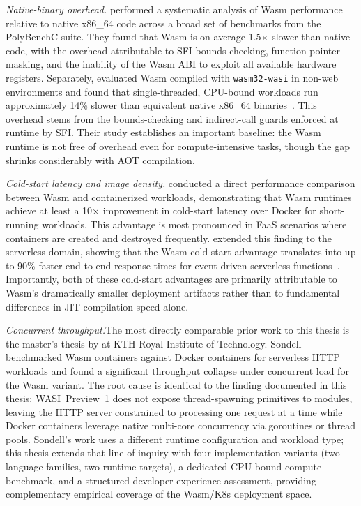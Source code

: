 \textit{Native-binary overhead.}\quad \textcite{jangda2019notsofast} performed a systematic analysis of \acs{Wasm} performance relative to native x86\_64 code across a broad set of benchmarks from the PolyBenchC suite. They found that \acs{Wasm} is on average 1.5$\times$ slower than native code, with the overhead attributable to \acs{SFI} bounds-checking, function pointer masking, and the inability of the \acs{Wasm} \acs{ABI} to exploit all available hardware registers. Separately, \textcite{spies2021evaluation} evaluated \acs{Wasm} compiled with \texttt{wasm32-wasi} in non-web environments and found that single-threaded, \acs{CPU}-bound workloads run approximately 14\% slower than equivalent native x86\_64 binaries~\cite{spies2021evaluation}. This overhead stems from the bounds-checking and indirect-call guards enforced at runtime by \acs{SFI}. Their study establishes an important baseline: the \acs{Wasm} runtime is not free of overhead even for compute-intensive tasks, though the gap shrinks considerably with \ac{AOT} compilation.

\textit{Cold-start latency and image density.}\quad \textcite{long2023wasm} conducted a direct performance comparison between \acs{Wasm} and containerized workloads, demonstrating that \acs{Wasm} runtimes achieve at least a 10$\times$ improvement in cold-start latency over Docker for short-running workloads. This advantage is most pronounced in \acl{FaaS} scenarios where containers are created and destroyed frequently. \textcite{hall2021serverless} extended this finding to the serverless domain, showing that the \acs{Wasm} cold-start advantage translates into up to 90\% faster end-to-end response times for event-driven serverless functions~\cite{hall2021serverless}. Importantly, both of these cold-start advantages are primarily attributable to \acs{Wasm}'s dramatically smaller deployment artifacts rather than to fundamental differences in \ac{JIT} compilation speed alone.

\textit{Concurrent throughput.}\quad The most directly comparable prior work to this thesis is the master's thesis by \textcite{sondell2024performance} at \acs{KTH} Royal Institute of Technology. Sondell benchmarked \acs{Wasm} containers against Docker containers for serverless \acs{HTTP} workloads and found a significant throughput collapse under concurrent load for the \acs{Wasm} variant. The root cause is identical to the finding documented in this thesis: \acs{WASI}~Preview~1 does not expose thread-spawning primitives to modules, leaving the \acs{HTTP} server constrained to processing one request at a time while Docker containers leverage native multi-core concurrency via goroutines or thread pools. Sondell's work uses a different runtime configuration and workload type; this thesis extends that line of inquiry with four implementation variants (two language families, two runtime targets), a dedicated \acs{CPU}-bound compute benchmark, and a structured developer experience assessment, providing complementary empirical coverage of the \acs{Wasm}/\acs{K8s} deployment space.


